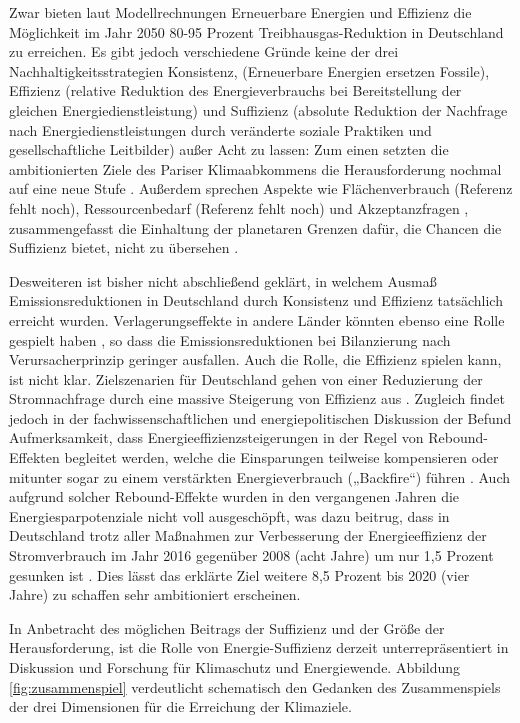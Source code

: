 \documentclass[a4paper,11pt,twoside]{scrartcl}
\begin{document}
Zwar bieten laut Modellrechnungen Erneuerbare Energien und Effizienz die Möglichkeit im Jahr 2050 80-95 Prozent Treibhausgas-Reduktion in Deutschland \cite{BMWi2017} zu erreichen. Es gibt jedoch verschiedene Gründe keine der drei Nachhaltigkeitsstrategien Konsistenz, (Erneuerbare Energien ersetzen Fossile), Effizienz (relative Reduktion des Energieverbrauchs bei Bereitstellung der gleichen Energiedienstleistung) und Suffizienz (absolute Reduktion der Nachfrage nach Energiedienstleistungen durch veränderte soziale Praktiken und gesellschaftliche Leitbilder) außer Acht zu lassen: Zum einen setzten die ambitionierten Ziele des Pariser Klimaabkommens die Herausforderung nochmal auf eine neue Stufe \cite{Rogelj2018}. Außerdem sprechen Aspekte wie Flächenverbrauch (Referenz fehlt noch), Ressourcenbedarf (Referenz fehlt noch) und Akzeptanzfragen \cite{Fuchs2016}, zusammengefasst die Einhaltung der planetaren Grenzen \cite{Rockstroem2009} dafür, die Chancen die Suffizienz bietet, nicht zu übersehen \cite{SAMADI2017}.

Desweiteren ist bisher nicht abschließend geklärt, in welchem Ausmaß Emissionsreduktionen in Deutschland durch Konsistenz und Effizienz tatsächlich erreicht wurden. Verlagerungseffekte in andere Länder könnten ebenso eine Rolle gespielt haben \cite{Wiedmann2015}, so dass die Emissionsreduktionen bei Bilanzierung nach Verursacherprinzip geringer ausfallen. Auch die Rolle, die Effizienz spielen kann, ist nicht klar. Zielszenarien für Deutschland gehen von einer Reduzierung der Stromnachfrage durch eine massive Steigerung von Effizienz aus \cite{BMWi2017}. Zugleich findet jedoch in der fachwissenschaftlichen und energiepolitischen Diskussion der Befund Aufmerksamkeit, dass Energieeffizienzsteigerungen in der Regel von Rebound-Effekten begleitet werden, welche die Einsparungen teilweise kompensieren oder mitunter sogar zu einem verstärkten Energieverbrauch („Backfire“) führen \cite{DeutscherBundestag2013,Santarius2012}. Auch aufgrund solcher Rebound-Effekte wurden in den vergangenen Jahren die Energiesparpotenziale nicht voll ausgeschöpft, was dazu beitrug, dass in Deutschland trotz aller Maßnahmen zur Verbesserung der Energieeffizienz der Stromverbrauch im Jahr 2016 gegenüber 2008 (acht Jahre) um nur 1,5 Prozent gesunken ist \cite{UBA2017}. Dies lässt das erklärte Ziel weitere 8,5 Prozent bis 2020 (vier Jahre) zu schaffen sehr ambitioniert erscheinen.

In Anbetracht des möglichen Beitrags der Suffizienz und der Größe der Herausforderung, ist die Rolle von Energie-Suffizienz derzeit unterrepräsentiert in Diskussion und Forschung für Klimaschutz und Energiewende. Abbildung \ref{fig:zusammenspiel} verdeutlicht schematisch den Gedanken des Zusammenspiels der drei Dimensionen für die Erreichung der Klimaziele. 
\end{document}
